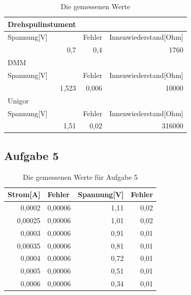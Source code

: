 \documentclass[12pt]{scrartcl}
\begin{document}
\begin{table}[htbp]
\caption{Die gemessenen Werte}
\begin{tabular}{|l|l|l|}
\hline
Drehspulinstument &  &  \\ \hline
Spannung[V] & Fehler & Innenwiederstand[Ohm] \\ \hline
\multicolumn{1}{|r|}{0,7} & \multicolumn{1}{r|}{0,4} & \multicolumn{1}{r|}{1760} \\ \hline
DMM &  &  \\ \hline
Spannung[V] & Fehler & Innenwiederstand[Ohm] \\ \hline
\multicolumn{1}{|r|}{1,523} & \multicolumn{1}{r|}{0,006} & \multicolumn{1}{r|}{10000} \\ \hline
Unigor &  &  \\ \hline
Spannung[V] & Fehler & Innenwiederstand[Ohm] \\ \hline
\multicolumn{1}{|r|}{1,51} & \multicolumn{1}{r|}{0,02} & \multicolumn{1}{r|}{316000} \\ \hline
\end{tabular}
\label{aufgabe_4_messwerte}
\end{table}

\newpage

\subsection{Aufgabe 5}

\begin{table}[htbp]
\caption{Die gemessenen Werte für Aufgabe 5}
\begin{tabular}{|r|r|r|r|}
\hline
\multicolumn{1}{|l|}{Strom[A]} & \multicolumn{1}{l|}{Fehler} & \multicolumn{1}{l|}{Spannung[V]} & \multicolumn{1}{l|}{Fehler} \\ \hline
0,0002 & 0,00006 & 1,11 & 0,02 \\ \hline
0,00025 & 0,00006 & 1,01 & 0,02 \\ \hline
0,0003 & 0,00006 & 0,91 & 0,01 \\ \hline
0,00035 & 0,00006 & 0,81 & 0,01 \\ \hline
0,0004 & 0,00006 & 0,72 & 0,01 \\ \hline
0,0005 & 0,00006 & 0,51 & 0,01 \\ \hline
0,0006 & 0,00006 & 0,34 & 0,01 \\ \hline
\end{tabular}
\label{aufgabe_5_messwerte}
\end{table}

\newpage
\end{document}
